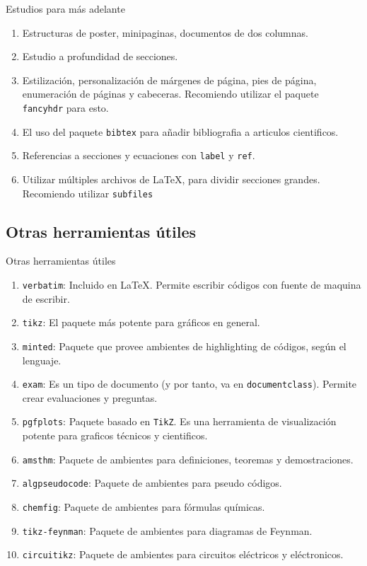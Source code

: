 \documentclass[../slides.tex]{subfiles}
\begin{document}
    \begin{frame}{Estudios para más adelante}
        \begin{enumerate}
        	\item Estructuras de poster, minipaginas, documentos de dos columnas.
        	\item Estudio a profundidad de secciones.
        	\item Estilización, personalización de márgenes de página, pies de página, enumeración de páginas y cabeceras. Recomiendo utilizar el paquete \texttt{fancyhdr} para esto.
        	\item El uso del paquete \texttt{bibtex} para añadir bibliografia a articulos cientificos.
        	\item Referencias a secciones y ecuaciones con \texttt{label} y \texttt{ref}.
        	\item Utilizar múltiples archivos de \LaTeX{}, para dividir secciones grandes. Recomiendo utilizar \texttt{subfiles}
        \end{enumerate}
    \end{frame}
    
    \subsection{Otras herramientas útiles}
    \begin{frame}{Otras herramientas útiles}
       \begin{enumerate}
            \item \texttt{verbatim}: Incluido en \LaTeX{}. Permite escribir códigos con fuente de maquina de escribir.
            \item \texttt{tikz}: El paquete más potente para gráficos en general.
            \item \texttt{minted}: Paquete que provee ambientes de highlighting de códigos, según el lenguaje.
            \item \texttt{exam}: Es un tipo de documento (y por tanto, va en \texttt{documentclass}). Permite crear evaluaciones y preguntas.
            \item \texttt{pgfplots}: Paquete basado en \texttt{TikZ}. Es una herramienta de visualización potente para graficos técnicos y cientificos.
            \item \texttt{amsthm}: Paquete de ambientes para definiciones, teoremas y demostraciones.
            \item \texttt{algpseudocode}: Paquete de ambientes para pseudo códigos.
            \item \texttt{chemfig}: Paquete de ambientes para fórmulas químicas.
            \item \texttt{tikz-feynman}: Paquete de ambientes para diagramas de Feynman.
            \item \texttt{circuitikz}: Paquete de ambientes para circuitos eléctricos y eléctronicos.
       \end{enumerate}
    \end{frame}
    
\end{document}
